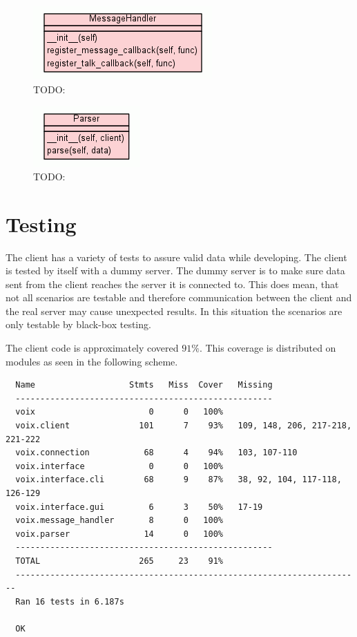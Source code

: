\documentclass[12pt]{rapport}
\begin{document}
\begin{figure}[H]
  \begin{center}
    \includegraphics[scale=0.9]{../uml/uml_class_diagram_for_voix_mes}
    \caption{TODO:}
  \end{center}
\end{figure}
\begin{figure}[H]
  \begin{center}
    \includegraphics[scale=0.9]{../uml/uml_class_diagram_for_voix_par}
    \caption{TODO:}
  \end{center}
\end{figure}
\section*{Testing}
The client has a variety of tests to assure valid data while
developing. The client is tested by itself with a dummy server. The
dummy server is to make sure data sent from the client reaches the
server it is connected to. This does mean, that not all scenarios are
testable and therefore communication between the client and the real
server may cause unexpected results. In this situation the scenarios
are only testable by black-box testing.

The client code is approximately covered $91\%$. This coverage is
distributed on modules as seen in the following scheme.

\begin{verbatim}
  Name                   Stmts   Miss  Cover   Missing
  ----------------------------------------------------
  voix                       0      0   100%
  voix.client              101      7    93%   109, 148, 206, 217-218, 221-222
  voix.connection           68      4    94%   103, 107-110
  voix.interface             0      0   100%
  voix.interface.cli        68      9    87%   38, 92, 104, 117-118, 126-129
  voix.interface.gui         6      3    50%   17-19
  voix.message_handler       8      0   100%
  voix.parser               14      0   100%
  ----------------------------------------------------
  TOTAL                    265     23    91%
  ----------------------------------------------------------------------
  Ran 16 tests in 6.187s

  OK
\end{verbatim}
\end{document}
